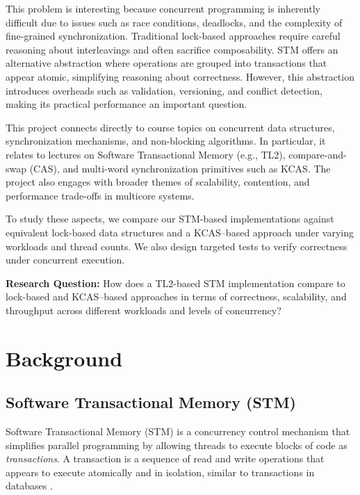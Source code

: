 \documentclass[11pt,a4paper]{article}
\begin{document}
This problem is interesting because concurrent programming is inherently difficult due to issues such as race conditions, deadlocks, and the complexity of fine-grained synchronization. Traditional lock-based approaches require careful reasoning about interleavings and often sacrifice composability. STM offers an alternative abstraction where operations are grouped into transactions that appear atomic, simplifying reasoning about correctness. However, this abstraction introduces overheads such as validation, versioning, and conflict detection, making its practical performance an important question.


This project connects directly to course topics on concurrent data structures, synchronization mechanisms, and non-blocking algorithms. In particular, it relates to lectures on Software Transactional Memory (e.g., TL2), compare-and-swap (CAS), and multi-word synchronization primitives such as KCAS. The project also engages with broader themes of scalability, contention, and performance trade-offs in multicore systems.


To study these aspects, we compare our STM-based implementations against equivalent lock-based data structures and a KCAS–based approach under varying workloads and thread counts. We also design targeted tests to verify correctness under concurrent execution.


\textbf{Research Question:} How does a TL2-based STM implementation compare to lock-based and KCAS–based approaches in terms of correctness, scalability, and throughput across different workloads and levels of concurrency?


\section{Background}
\label{sec:background}

\subsection{Software Transactional Memory (STM)}

Software Transactional Memory (STM) is a concurrency control mechanism that simplifies parallel programming by allowing threads to execute blocks of code as \textit{transactions}. A transaction is a sequence of read and write operations that appears to execute atomically and in isolation, similar to transactions in databases \cite{tl2}.
\end{document}
